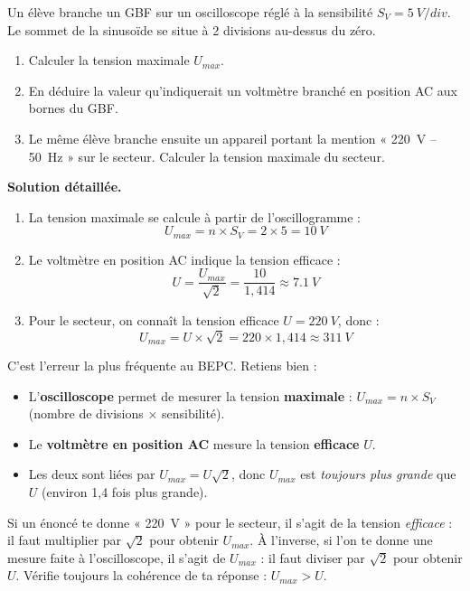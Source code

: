\documentclass[11pt]{article}
\begin{document}
\begin{exoresolu}
Un élève branche un GBF sur un oscilloscope réglé à la sensibilité $S_V = \SI{5}{V/div}$. Le sommet de la sinusoïde se situe à 2 divisions au-dessus du zéro.
\begin{enumerate}
\item Calculer la tension maximale $U_{max}$.
\item En déduire la valeur qu'indiquerait un voltmètre branché en position AC aux bornes du GBF.
\item Le même élève branche ensuite un appareil portant la mention « \SI{220}{V} -- \SI{50}{Hz} » sur le secteur. Calculer la tension maximale du secteur.
\end{enumerate}
\tcblower
\textbf{Solution détaillée.}
\begin{enumerate}
\item La tension maximale se calcule à partir de l'oscillogramme :
\[ U_{max} = n \times S_V = 2 \times 5 = \SI{10}{V} \]
\item Le voltmètre en position AC indique la tension efficace :
\[ U = \frac{U_{max}}{\sqrt{2}} = \frac{10}{1,414} \approx \SI{7,1}{V} \]
\item Pour le secteur, on connaît la tension efficace $U = \SI{220}{V}$, donc :
\[ U_{max} = U \times \sqrt{2} = 220 \times 1,414 \approx \SI{311}{V} \]
\end{enumerate}
\end{exoresolu}

\begin{attention}
C'est l'erreur la plus fréquente au BEPC. Retiens bien :
\begin{itemize}
\item L'\textbf{oscilloscope} permet de mesurer la tension \textbf{maximale} : $U_{max} = n \times S_V$ (nombre de divisions $\times$ sensibilité).
\item Le \textbf{voltmètre en position AC} mesure la tension \textbf{efficace} $U$.
\item Les deux sont liées par $U_{max} = U\sqrt{2}$, donc $U_{max}$ est \emph{toujours plus grande} que $U$ (environ 1,4 fois plus grande).
\end{itemize}
Si un énoncé te donne « \SI{220}{V} » pour le secteur, il s'agit de la tension \emph{efficace} : il faut multiplier par $\sqrt{2}$ pour obtenir $U_{max}$. À l'inverse, si l'on te donne une mesure faite à l'oscilloscope, il s'agit de $U_{max}$ : il faut diviser par $\sqrt{2}$ pour obtenir $U$. Vérifie toujours la cohérence de ta réponse : $U_{max} > U$.
\end{attention}
\end{document}

